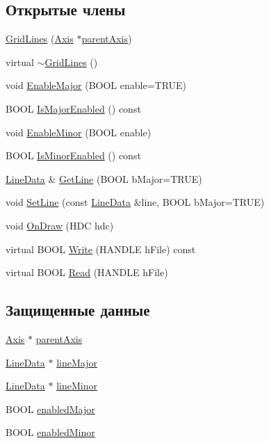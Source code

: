 \subsection*{Открытые члены}
\begin{DoxyCompactItemize}
\item 
\hyperlink{class_grid_lines_a8b75ba08cc39e81740ccc456875f15f7}{Grid\-Lines} (\hyperlink{class_axis}{Axis} $\ast$\hyperlink{class_grid_lines_a1e3ebb07403f525c882731bb1662b234}{parent\-Axis})
\item 
virtual \hyperlink{class_grid_lines_afc1d1925713bf15c1f031d41a901016b}{$\sim$\-Grid\-Lines} ()
\item 
void \hyperlink{class_grid_lines_acefec88256cbb7dc4982e65666add9bb}{Enable\-Major} (B\-O\-O\-L enable=T\-R\-U\-E)
\item 
B\-O\-O\-L \hyperlink{class_grid_lines_a1208cfa5117f703ed785eba8c7ecae00}{Is\-Major\-Enabled} () const 
\item 
void \hyperlink{class_grid_lines_ab72907a0dcdb11acfeb473fb4c573939}{Enable\-Minor} (B\-O\-O\-L enable)
\item 
B\-O\-O\-L \hyperlink{class_grid_lines_af6a52af538900e6ec6cd6eb53ffa6d29}{Is\-Minor\-Enabled} () const 
\item 
\hyperlink{class_line_data}{Line\-Data} \& \hyperlink{class_grid_lines_a996a81d74b11f797745a3913b7c12293}{Get\-Line} (B\-O\-O\-L b\-Major=T\-R\-U\-E)
\item 
void \hyperlink{class_grid_lines_a420d336ed2892850bf5aab748d0fe406}{Set\-Line} (const \hyperlink{class_line_data}{Line\-Data} \&line, B\-O\-O\-L b\-Major=T\-R\-U\-E)
\item 
void \hyperlink{class_grid_lines_a839784fc12725e0705c751f8c9f466aa}{On\-Draw} (H\-D\-C hdc)
\item 
virtual B\-O\-O\-L \hyperlink{class_grid_lines_af41e725b2af5e093e5307e2096c2c4c7}{Write} (H\-A\-N\-D\-L\-E h\-File) const 
\item 
virtual B\-O\-O\-L \hyperlink{class_grid_lines_aecc543959e2bfa9c45345257433a3110}{Read} (H\-A\-N\-D\-L\-E h\-File)
\end{DoxyCompactItemize}
\subsection*{Защищенные данные}
\begin{DoxyCompactItemize}
\item 
\hyperlink{class_axis}{Axis} $\ast$ \hyperlink{class_grid_lines_a1e3ebb07403f525c882731bb1662b234}{parent\-Axis}
\item 
\hyperlink{class_line_data}{Line\-Data} $\ast$ \hyperlink{class_grid_lines_a3e368e27515f01143f5470b65c9f2a52}{line\-Major}
\item 
\hyperlink{class_line_data}{Line\-Data} $\ast$ \hyperlink{class_grid_lines_a72d2d255547ee192ff15609a254994fe}{line\-Minor}
\item 
B\-O\-O\-L \hyperlink{class_grid_lines_ad32092e3573f3fd24c3b1190f35034aa}{enabled\-Major}
\item 
B\-O\-O\-L \hyperlink{class_grid_lines_ae7f5d84d6a6b353e22fd251a20ac33f5}{enabled\-Minor}
\end{DoxyCompactItemize}
